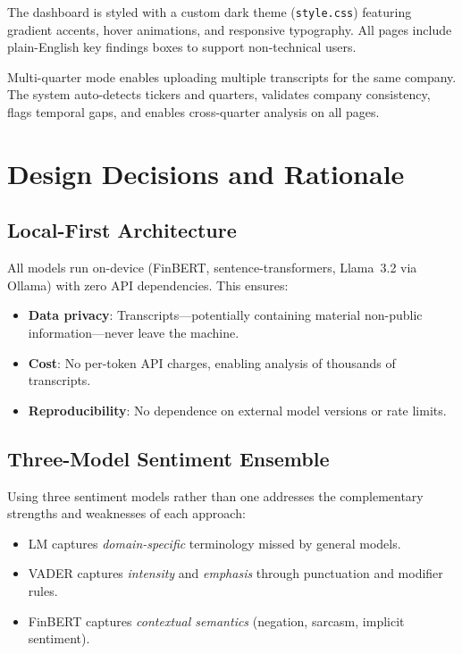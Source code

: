 \documentclass[12pt,a4paper]{article}
\begin{document}
The dashboard is styled with a custom dark theme (\texttt{style.css}) featuring gradient accents, hover animations, and responsive typography. All pages include plain-English key findings boxes to support non-technical users.

Multi-quarter mode enables uploading multiple transcripts for the same company. The system auto-detects tickers and quarters, validates company consistency, flags temporal gaps, and enables cross-quarter analysis on all pages.


\section{Design Decisions and Rationale}
\label{sec:decisions}

\subsection{Local-First Architecture}

All models run on-device (FinBERT, sentence-transformers, Llama~3.2 via Ollama) with zero API dependencies. This ensures:
\begin{itemize}[noitemsep]
    \item \textbf{Data privacy}: Transcripts---potentially containing material non-public information---never leave the machine.
    \item \textbf{Cost}: No per-token API charges, enabling analysis of thousands of transcripts.
    \item \textbf{Reproducibility}: No dependence on external model versions or rate limits.
\end{itemize}

\subsection{Three-Model Sentiment Ensemble}

Using three sentiment models rather than one addresses the complementary strengths and weaknesses of each approach:
\begin{itemize}[noitemsep]
    \item LM captures \emph{domain-specific} terminology missed by general models.
    \item VADER captures \emph{intensity} and \emph{emphasis} through punctuation and modifier rules.
    \item FinBERT captures \emph{contextual semantics} (negation, sarcasm, implicit sentiment).
\end{itemize}
\end{document}

